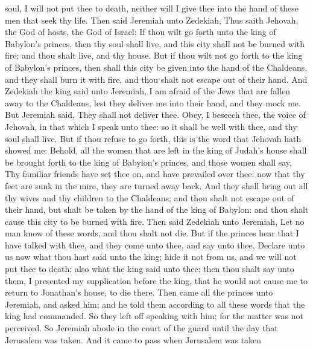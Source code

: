 soul, I will not put thee to death, neither will I give thee into the hand of these men that seek thy life.  Then said Jeremiah unto Zedekiah, Thus saith Jehovah, the God of hosts, the God of Israel: If thou wilt go forth unto the king of Babylon’s princes, then thy soul shall live, and this city shall not be burned with fire; and thou shalt live, and thy house. But if thou wilt not go forth to the king of Babylon’s princes, then shall this city be given into the hand of the Chaldeans, and they shall burn it with fire, and thou shalt not escape out of their hand. And Zedekiah the king said unto Jeremiah, I am afraid of the Jews that are fallen away to the Chaldeans, lest they deliver me into their hand, and they mock me. But Jeremiah said, They shall not deliver thee. Obey, I beseech thee, the voice of Jehovah, in that which I speak unto thee: so it shall be well with thee, and thy soul shall live. But if thou refuse to go forth, this is the word that Jehovah hath showed me: Behold, all the women that are left in the king of Judah’s house shall be brought forth to the king of Babylon’s princes, and those women shall say, Thy familiar friends have set thee on, and have prevailed over thee: now that thy feet are sunk in the mire, they are turned away back. And they shall bring out all thy wives and thy children to the Chaldeans; and thou shalt not escape out of their hand, but shalt be taken by the hand of the king of Babylon: and thou shalt cause this city to be burned with fire.  Then said Zedekiah unto Jeremiah, Let no man know of these words, and thou shalt not die. But if the princes hear that I have talked with thee, and they come unto thee, and say unto thee, Declare unto us now what thou hast said unto the king; hide it not from us, and we will not put thee to death; also what the king said unto thee: then thou shalt say unto them, I presented my supplication before the king, that he would not cause me to return to Jonathan’s house, to die there. Then came all the princes unto Jeremiah, and asked him; and he told them according to all these words that the king had commanded. So they left off speaking with him; for the matter was not perceived. So Jeremiah abode in the court of the guard until the day that Jerusalem was taken. And it came to pass when Jerusalem was taken 

